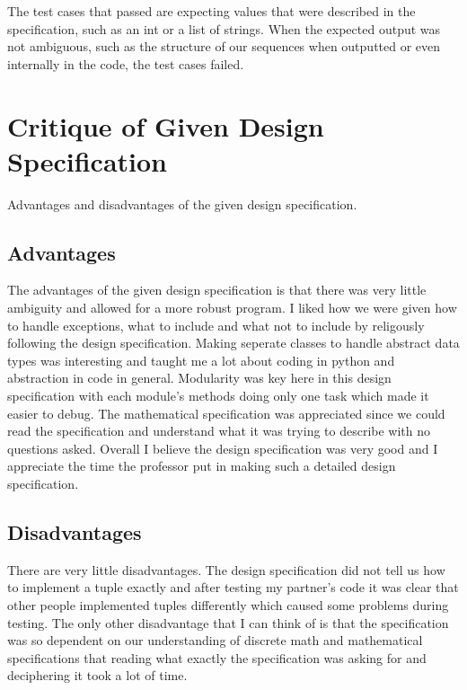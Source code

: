 \documentclass[12pt]{article}
\begin{document}
The test cases that passed are expecting values that were described in the specification, such as an int or a list of strings. When the 
expected output was not ambiguous, such as the structure of our sequences when outputted or even internally in the code, the test cases failed. 

\newpage

\section{Critique of Given Design Specification}

Advantages and disadvantages of the given design specification.

\subsection{Advantages}
The advantages of the given design specification is that there was very little ambiguity and allowed for a more robust program. 
I liked how we were given how to handle exceptions, what to include and what not to include by religously following the design
specification. Making seperate classes to handle abstract data types was interesting and taught me a lot about coding in python and
abstraction in code in general. Modularity was key here in this design specification with each module's methods doing only one task
which made it easier to debug. The mathematical specification was appreciated since we could read the specification and understand what it 
was trying to describe with no questions asked. Overall I believe the design specification was very good and I appreciate the time the professor
put in making such a detailed design specification.

\subsection{Disadvantages}
There are very little disadvantages. The design specification did not tell us how to implement a tuple exactly and after testing my partner's code 
it was clear that other people implemented tuples differently which caused some problems during testing. The only other disadvantage that I can 
think of is that the specification was so dependent on our understanding of discrete math and mathematical specifications that reading what exactly
the specification was asking for and deciphering it took a lot of time. 

\newpage
\end{document}

